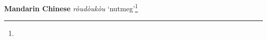 \begin{etymology}\label{ety:roudoukou}
\textbf{Mandarin Chinese}  \textit{ròudòukòu} `nutmeg'\footnote{}
\end{etymology}